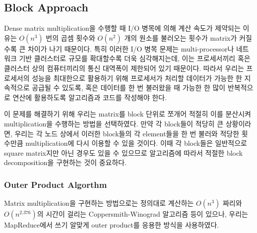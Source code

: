 \documentclass[a4paper]{article}
\begin{document}
\begin{multicols}{2}
\subsection{Block Approach}
Dense matrix multiplication을 수행할 때 I/O 병목에 의해 계산 속도가 제약되는 이유는 $O(n^3)$ 번의 곱셈 횟수와 $O(n^2)$ 개의 원소를 불러오는 횟수가 matrix가 커질수록 큰 차이가 나기 때문이다.
특히 이러한 I/O 병목 문제는 multi-processor나 네트워크 기반 클러스터로 규모를 확대할수록 더욱 심각해지는데, 이는 프로세서끼리 혹은 클러스터 상의 컴퓨터끼리의 통신 대역폭이 제한되어 있기 때문이다.
따라서 우리는 프로세서의 성능을 최대한으로 활용하기 위해 프로세서가 처리할 데이터가 가능한 한 지속적으로 공급될 수 있도록, 혹은 데이터를 한 번 불러왔을 때 가능한 한 많이 반복적으로 연산에 활용하도록 알고리즘과 코드를 작성해야 한다.

이 문제를 해결하기 위해 우리는 matrix를 block 단위로 쪼개어 적절히 이를 분산시켜 multiplication을 수행하는 방법을 선택하였다.
만약 각 block들이 적당히 큰 상황이라면, 우리는 각 노드 상에서 이러한 block들의 각 element들을 한 번 불러와 적당한 횟수만큼 multiplication에 다시 이용할 수 있을 것이다.
이때 각 block들은 일반적으로 square matrix지만 아닌 경우도 있을 수 있으므로 알고리즘에 따라서 적절한 block decomposition을 구현하는 것이 중요하다.

\subsubsection{Outer Product Algorthm}
Matrix multiplication을 구현하는 방법으로는 정의대로 계산하는 $O(n^3)$ 짜리와 $O(n^{2.376})$의 시간이 걸리는 Coppersmith-Winograd 알고리즘 등이 있으나, 우리는 MapReduce에서 쓰기 알맞게 outer product를 응용한 방식을 사용하였다.


\end{multicols}
\end{document}
